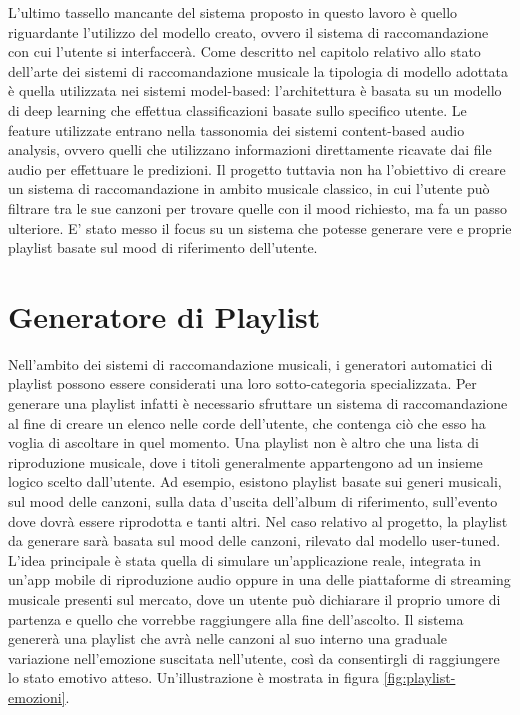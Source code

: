 \documentclass[11pt]{report}
\begin{document}
L'ultimo tassello mancante del sistema proposto in questo lavoro è quello riguardante l'utilizzo del modello creato, ovvero il sistema di raccomandazione con cui l'utente si interfaccerà. Come descritto nel capitolo relativo allo stato dell'arte dei sistemi di raccomandazione musicale la tipologia di modello adottata è quella utilizzata nei sistemi model-based: l'architettura è basata su un modello di deep learning che effettua classificazioni basate sullo specifico utente. Le feature utilizzate entrano nella tassonomia dei sistemi content-based audio analysis, ovvero quelli che utilizzano informazioni direttamente ricavate dai file audio per effettuare le predizioni. Il progetto tuttavia non ha l'obiettivo di creare un sistema di raccomandazione in ambito musicale classico, in cui l'utente può filtrare tra le sue canzoni per trovare quelle con il mood richiesto, ma fa un passo ulteriore. E' stato messo il focus su un sistema che potesse generare vere e proprie playlist basate sul mood di riferimento dell'utente. 


\section{Generatore di Playlist}


Nell'ambito dei sistemi di raccomandazione musicali, i generatori automatici di playlist possono essere considerati una loro sotto-categoria specializzata. Per generare una playlist infatti è necessario sfruttare un sistema di raccomandazione al fine di creare un elenco nelle corde dell'utente, che contenga ciò che esso ha voglia di ascoltare in quel momento. Una playlist non è altro che una lista di riproduzione musicale, dove i titoli generalmente appartengono ad un insieme logico scelto dall'utente. Ad esempio, esistono playlist basate sui generi musicali, sul mood delle canzoni, sulla data d'uscita dell'album di riferimento, sull'evento dove dovrà essere riprodotta e tanti altri. Nel caso relativo al progetto, la playlist da generare sarà basata sul mood delle canzoni, rilevato dal modello user-tuned. L'idea principale è stata quella di simulare un'applicazione reale, integrata in un'app mobile di riproduzione audio oppure in una delle piattaforme di streaming musicale presenti sul mercato, dove un utente può dichiarare il proprio umore di partenza e quello che vorrebbe raggiungere alla fine dell'ascolto. Il sistema genererà una playlist che avrà nelle canzoni al suo interno una graduale variazione nell'emozione suscitata nell'utente, così da consentirgli di raggiungere lo stato emotivo atteso. Un'illustrazione è mostrata in figura \ref{fig:playlist-emozioni}.
\end{document}
